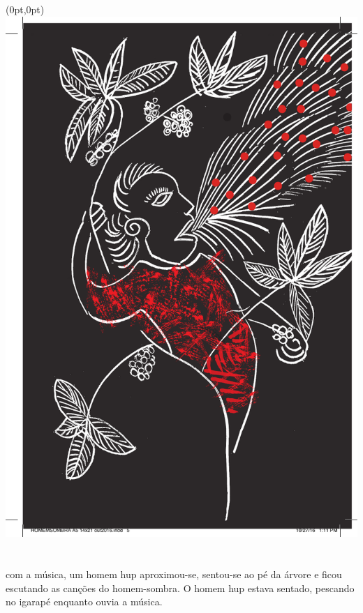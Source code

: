 \begin{textblock*}{8in}(0pt,0pt)%
\vspace*{-2.8cm}
\hspace*{-3.2cm}\includegraphics[width=153mm]{./imgs/img1.pdf}
\end{textblock*}

\chapter*{}

\mbox{}\vspace*{\fill}

 com a música,
um homem hup aproximou-se,
sentou-se ao pé da
árvore e ficou escutando as
canções do homem-sombra. O
homem hup estava sentado,
pescando no igarapé
enquanto ouvia a música.


